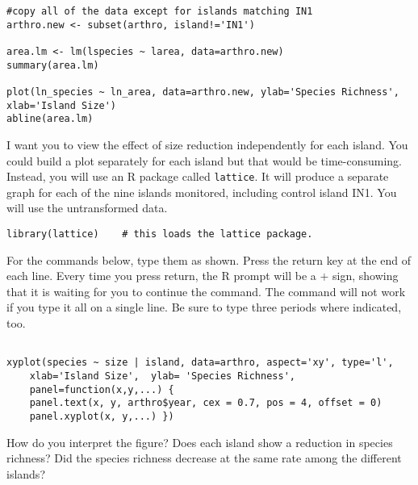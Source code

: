\documentclass[11pt]{article}
\begin{document}
\begin{verbatim}
#copy all of the data except for islands matching IN1
arthro.new <- subset(arthro, island!='IN1')  

area.lm <- lm(lspecies ~ larea, data=arthro.new)
summary(area.lm)

plot(ln_species ~ ln_area, data=arthro.new, ylab='Species Richness', xlab='Island Size')
abline(area.lm)

\end{verbatim}

I want you to view the effect of size reduction independently for each island.  You could build a plot separately for each island but that would be time-consuming.  Instead, you will use an R package called \texttt{lattice}.  It will produce a separate graph for each of the nine islands monitored, including control island IN1. You will use the untransformed data.


\begin{verbatim}
library(lattice)	# this loads the lattice package.

\end{verbatim}


For the commands below, type them as shown. Press the return key at the end of each line. Every time you press return, the R prompt will be a $+$ sign, showing that it is waiting for you to continue the command.  The command will not work if you type it all on a single line. Be sure to type three periods where indicated, too.

\begin{verbatim}

xyplot(species ~ size | island, data=arthro, aspect='xy', type='l', 
    xlab='Island Size',  ylab= 'Species Richness', 
    panel=function(x,y,...) {
    panel.text(x, y, arthro$year, cex = 0.7, pos = 4, offset = 0)
    panel.xyplot(x, y,...) })

\end{verbatim}

How do you interpret the figure? Does each island show a reduction in species richness?  Did the species richness decrease at the same rate among the different islands?
\end{document}
